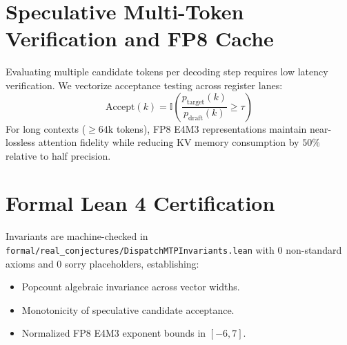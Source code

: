 \documentclass[11pt,a4paper]{article}
\begin{document}
\section{Speculative Multi-Token Verification and FP8 Cache}
Evaluating multiple candidate tokens per decoding step requires low latency verification. We vectorize acceptance testing across register lanes:
\begin{equation}
\text{Accept}(k) = \mathbb{I}\left( \frac{p_{\text{target}}(k)}{p_{\text{draft}}(k)} \ge \tau \right)
\end{equation}
For long contexts ($\ge 64\text{k}$ tokens), FP8 E4M3 representations maintain near-lossless attention fidelity while reducing KV memory consumption by $50\%$ relative to half precision.

\section{Formal Lean 4 Certification}
Invariants are machine-checked in \texttt{formal/real\_conjectures/DispatchMTPInvariants.lean} with 0 non-standard axioms and 0 sorry placeholders, establishing:
\begin{itemize}
    \item Popcount algebraic invariance across vector widths.
    \item Monotonicity of speculative candidate acceptance.
    \item Normalized FP8 E4M3 exponent bounds in $[-6, 7]$.
\end{itemize}
\end{document}
